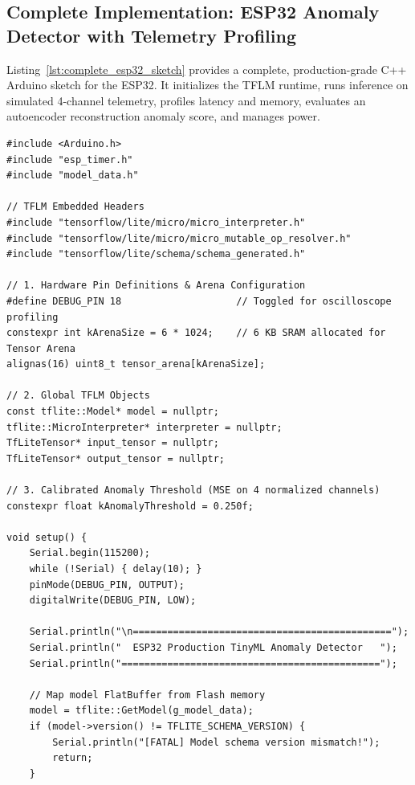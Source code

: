 \subsection{Complete Implementation: ESP32 Anomaly Detector with Telemetry Profiling}\label{subsec:complete_esp32_code}

Listing~\ref{lst:complete_esp32_sketch} provides a complete, production-grade C++ Arduino sketch for the ESP32. It initializes the TFLM runtime, runs inference on simulated 4-channel telemetry, profiles latency and memory, evaluates an autoencoder reconstruction anomaly score, and manages power.

\begin{lstlisting}[style=pythonstyle, caption={Complete production-grade ESP32 TinyML anomaly detector with profiling.}, label={lst:complete_esp32_sketch}]
#include <Arduino.h>
#include "esp_timer.h"
#include "model_data.h"

// TFLM Embedded Headers
#include "tensorflow/lite/micro/micro_interpreter.h"
#include "tensorflow/lite/micro/micro_mutable_op_resolver.h"
#include "tensorflow/lite/schema/schema_generated.h"

// 1. Hardware Pin Definitions & Arena Configuration
#define DEBUG_PIN 18                    // Toggled for oscilloscope profiling
constexpr int kArenaSize = 6 * 1024;    // 6 KB SRAM allocated for Tensor Arena
alignas(16) uint8_t tensor_arena[kArenaSize];

// 2. Global TFLM Objects
const tflite::Model* model = nullptr;
tflite::MicroInterpreter* interpreter = nullptr;
TfLiteTensor* input_tensor = nullptr;
TfLiteTensor* output_tensor = nullptr;

// 3. Calibrated Anomaly Threshold (MSE on 4 normalized channels)
constexpr float kAnomalyThreshold = 0.250f;

void setup() {
    Serial.begin(115200);
    while (!Serial) { delay(10); }
    pinMode(DEBUG_PIN, OUTPUT);
    digitalWrite(DEBUG_PIN, LOW);

    Serial.println("\n=============================================");
    Serial.println("  ESP32 Production TinyML Anomaly Detector   ");
    Serial.println("=============================================");

    // Map model FlatBuffer from Flash memory
    model = tflite::GetModel(g_model_data);
    if (model->version() != TFLITE_SCHEMA_VERSION) {
        Serial.println("[FATAL] Model schema version mismatch!");
        return;
    }


\end{lstlisting}
